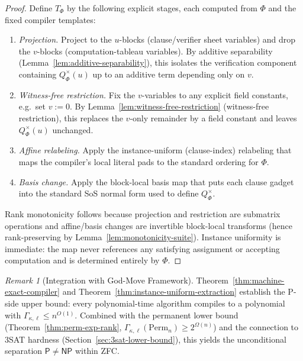 \documentclass[12pt]{article}
\theoremstyle{definition}
\theoremstyle{definition}
\theoremstyle{remark}
\newtheorem{remark}{Remark}
\theoremstyle{remark}
\begin{document}
\begin{proof}
Define $T_\Phi$ by the following explicit stages, each computed from $\Phi$ and the fixed
compiler templates:

\begin{enumerate}
\item \emph{Projection.} Project to the $u$-blocks (clause/verifier sheet variables) and drop the
$v$-blocks (computation-tableau variables). By additive separability (Lemma~\ref{lem:additive-separability}), this isolates the
verification component containing $Q^{\times}_\Phi(u)$ up to an additive term depending only on $v$.

\item \emph{Witness-free restriction.} Fix the $v$-variables to any explicit field constants,
e.g.\ set $v:=0$. By Lemma~\ref{lem:witness-free-restriction} (witness-free restriction),
this replaces the $v$-only remainder by a field constant and leaves $Q^{\times}_\Phi(u)$ unchanged.

\item \emph{Affine relabeling.} Apply the instance-uniform (clause-index) relabeling that maps the
compiler's local literal pads to the standard ordering for $\Phi$.

\item \emph{Basis change.} Apply the block-local basis map that puts each clause gadget into the
standard SoS normal form used to define $Q^{\times}_\Phi$.
\end{enumerate}

Rank monotonicity follows because projection and restriction are submatrix operations and
affine/basis changes are invertible block-local transforms (hence rank-preserving by Lemma~\ref{lem:monotonicity-suite}).
Instance uniformity is immediate: the map never references any satisfying assignment or
accepting computation and is determined entirely by $\Phi$.
\end{proof}

\begin{remark}[Integration with God-Move Framework]
Theorem~\ref{thm:machine-exact-compiler} and Theorem~\ref{thm:instance-uniform-extraction} establish the P-side upper bound: every polynomial-time algorithm compiles to a polynomial with $\Gamma_{\kappa,\ell} \leq n^{O(1)}$. Combined with the permanent lower bound (Theorem~\ref{thm:perm-exp-rank}, $\Gamma_{\kappa,\ell}(\mathrm{Perm}_n) \geq 2^{\Omega(n)}$) and the connection to 3SAT hardness (Section~\ref{sec:3sat-lower-bound}), this yields the unconditional separation $\mathsf{P} \neq \mathsf{NP}$ within ZFC.
\end{remark}
\end{document}
